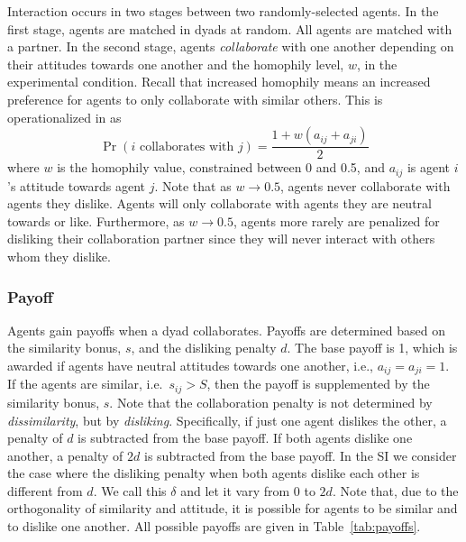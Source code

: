 \documentclass[11pt,letterpaper]{article}
\begin{document}
Interaction occurs in two stages between two randomly-selected agents.
In the first stage, agents are matched in dyads at random. All agents
are matched with a partner. In the second stage, agents \emph{collaborate} with
one another depending on their attitudes towards one another and the homophily
level, $w$, in the experimental condition.
Recall that increased homophily means an increased 
preference for agents to only collaborate with similar others. 
This is operationalized in as
\begin{equation}
  \Pr(\text{$i$ collaborates with $j$}) = \frac{1 + w(a_{ij} + a_{ji})}{2}
  \label{eq:homophily}
\end{equation}
\noindent
where $w$ is the homophily value, constrained between 0 and 0.5, and $a_{ij}$
is agent $i$'s attitude towards agent $j$.
Note that as $w \rightarrow 0.5$, agents never collaborate with agents they 
dislike. Agents will only collaborate with agents they are neutral towards
or like. Furthermore, as $w \rightarrow 0.5$, agents more rarely are 
penalized for disliking their collaboration partner since they will never
interact with others whom they dislike.


\subsubsection{Payoff}

Agents gain payoffs when a dyad collaborates. Payoffs
are determined based on the similarity bonus, $s$, and the disliking
penalty $d$. The base payoff is 1, which is awarded if agents have neutral
attitudes towards one another, i.e., $a_{ij}=a_{ji}=1$. 
If the agents are similar, i.e.\ $s_{ij} > S$, then 
the payoff is supplemented by the similarity bonus, $s$. Note that the
collaboration penalty is not determined by \emph{dissimilarity}, but by
\emph{disliking}. Specifically, if just one agent dislikes the other, a penalty
of $d$ is subtracted from the base payoff. If both agents dislike one another,
a penalty of $2d$ is subtracted from the base payoff. 
In the SI we consider the case where the disliking penalty 
when both agents dislike each other is different from $d$. We call this $\delta$
and let it vary from 0 to $2d$. Note that, due to the orthogonality of 
similarity and attitude, it is possible for agents to be similar and 
to dislike one another. All possible payoffs are given in 
Table~\ref{tab:payoffs}.
\end{document}
